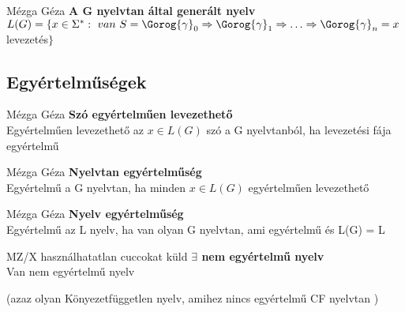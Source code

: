 \begin{definicio}{Mézga Géza}
   \textbf{A G nyelvtan által generált nyelv } \\[3pt]
   $L(G) = \lbrace x \in \Sigma^* :\ van\ S = \Gorog{\gamma}_0 \Rightarrow \Gorog{\gamma}_1 \Rightarrow \ldots \Rightarrow \Gorog{\gamma}_n = x$ levezetés$\rbrace$ \\[0pt]
\end{definicio}

\subsection{Egyértelműségek}

\begin{definicio}{Mézga Géza}
	\textbf{Szó egyértelműen levezethető} \\[3pt]
   Egyértelműen levezethető az $x \in L(G)$ szó a G nyelvtanból, ha levezetési fája egyértelmű \\[0pt]
\end{definicio}

\begin{definicio}{Mézga Géza}
    \textbf{Nyelvtan egyértelműség} \\[3pt]
	 Egyértelmű a G nyelvtan, ha minden $x \in L(G)$ egyértelműen levezethető \\[0pt]
\end{definicio}

\begin{definicio}{Mézga Géza}
	 \textbf{Nyelv egyértelműség} \\[3pt]
	 Egyértelmű az L nyelv, ha van olyan G nyelvtan, ami egyértelmű és L(G) = L \\[0pt]
\end{definicio}

	 \begin{tetel}{MZ/X használhatatlan cuccokat küld}
    \textbf{$\exists$ nem egyértelmű nyelv} \\[3pt]
  Van nem egyértelmű nyelv

  (azaz olyan Könyezetfüggetlen nyelv, amihez nincs egyértelmű CF nyelvtan )
\end{tetel}

  \notBiz
